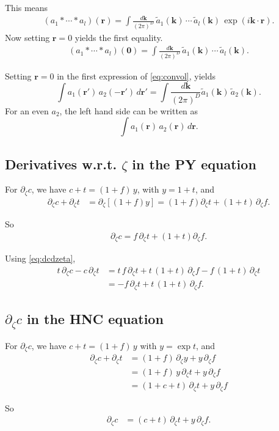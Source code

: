 \documentclass[aip,jcp,reprint,superscriptaddress]{revtex4-1}
\numberwithin{equation}{subsection}
\newcommand{\vct}[1]{\mathbf{#1}}
\providecommand{\vr}{} %
\renewcommand{\vr}{\vct{r}}
\newcommand{\vk}{\vct{k}}
\newcommand{\dvk}{\frac{d\vk}{(2\pi)^D}}
\begin{document}
This means
\begin{align*}
  (a_1 * \cdots * a_l)(\vr)
= \int \dvk \, \tilde{a}_1(\vk) \, \cdots \, \tilde{a}_l(\vk)
  \, \exp(i\vk\cdot\vr).
\end{align*}
%
Now setting $\vr = 0$ yields the first equality.
\begin{align*}
  (a_1 * \cdots * a_l)(\vct 0)
= \int \dvk \, \tilde{a}_1(\vk) \, \cdots \, \tilde{a}_l(\vk).
\end{align*}

Setting $\vr = 0$ in the first expression of \eqref{eq:convol}, yields
\[
  \int a_1(\vr') \, a_2(-\vr') \, d\vr'
= \int \dvk \tilde{a}_1(\vk) \, \tilde{a}_2(\vk).
\]
For an even $a_2$,
the left hand side can be written as
\[
  \int a_1(\vr) \, a_2(\vr) \, d\vr.
\]



\subsection{Derivatives w.r.t. $\zeta$ in the PY equation}



For $\partial_\zeta c$,
we have $c + t = (1 + f) \, y$,
with $y = 1 + t$,
and
\begin{align*}
\partial_\zeta c
+ \partial_\zeta t
&= \partial_\zeta [(1+f)y]
=
(1 + f) \partial_\zeta t
+ (1 + t) \, \partial_\zeta f.
\end{align*}

So
\begin{align}
\partial_\zeta c
=
f \, \partial_\zeta t
+ (1+t) \partial_\zeta f.
\label{eq:dcdzeta}
\end{align}

Using \eqref{eq:dcdzeta},
\begin{align*}
  t\, \partial_\zeta c - c \, \partial_\zeta t
&=
  t \, f \, \partial_\zeta t
+ t \, (1 + t) \, \partial_\zeta f
- f \, (1 + t) \, \partial_\zeta t
\\
&=
- f \, \partial_\zeta t
+ t \, (1 + t) \, \partial_\zeta f.
\end{align*}



\subsection{$\partial_\zeta c$ in the HNC equation}

For $\partial_\zeta c$, we have
$c + t = (1 + f) \, y$
with
$y = \exp t$,
and
\begin{align*}
  \partial_\zeta c + \partial_\zeta t
&= (1 + f) \, \partial_\zeta y
+ y \, \partial_\zeta f
\\
&= (1 + f) \, y \, \partial_\zeta t
+ y \, \partial_\zeta f
\\
&= (1 + c + t) \, \partial_\zeta t
+ y \, \partial_\zeta f
\end{align*}

So
\begin{align*}
  \partial_\zeta c
&= (c + t) \, \partial_\zeta t
+ y \, \partial_\zeta f.
\end{align*}

%
\end{document}
